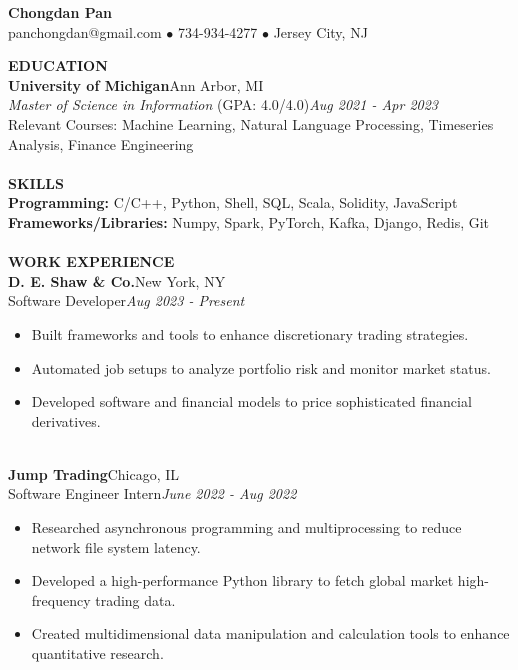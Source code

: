 \documentclass[10pt,a4paper]{article}
\begin{document}
\begin{center}
    \Large{\textbf{Chongdan Pan}}\\
    \normalsize{panchongdan@gmail.com $\bullet$ 734-934-4277 $\bullet$ Jersey City, NJ}\\
\end{center}
\noindent
\rlap{\rule[-1mm]{\linewidth}{.5mm}}\textbf{\large{EDUCATION}}\\
\noindent\textbf{University of Michigan}\hfill Ann Arbor, MI\\
\emph{Master of Science in Information} (GPA: 4.0/4.0)\hfill\emph{Aug 2021 - Apr 2023}\\
Relevant Courses: Machine Learning, Natural Language Processing, Timeseries Analysis, Finance Engineering \\\\
\noindent
\rlap{\rule[-1mm]{\linewidth}{.5mm}}\textbf{\large{SKILLS}}\\
\textbf{Programming: }C/C++, Python, Shell, SQL, Scala, Solidity, JavaScript\\
\textbf{Frameworks/Libraries: }Numpy, Spark, PyTorch, Kafka, Django, Redis, Git\\\\
\noindent
\rlap{\rule[-1mm]{\linewidth}{.5mm}}\textbf{\large{WORK EXPERIENCE}}\\
\textbf{D. E. Shaw \& Co.}\hfill New York, NY\\
Software Developer\hfill\emph{Aug 2023 - Present}
\begin{itemize}[noitemsep,topsep=0pt]
    \item Built frameworks and tools to enhance discretionary trading strategies.
    \item Automated job setups to analyze portfolio risk and monitor market status.
    \item Developed software and financial models to price sophisticated financial derivatives.
\end{itemize}
\noindent\\
\textbf{Jump Trading}\hfill Chicago, IL\\
Software Engineer Intern\hfill\emph{June 2022 - Aug 2022}
\begin{itemize}[noitemsep,topsep=0pt]
    \item Researched asynchronous programming and multiprocessing to reduce network file system latency.
    \item Developed a high-performance Python library to fetch global market high-frequency trading data.
    \item Created multidimensional data manipulation and calculation tools to enhance quantitative research.
\end{itemize}
\end{document}
